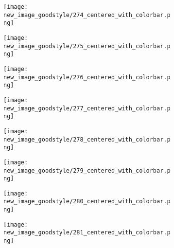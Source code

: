 \documentclass[a4paper,12pt]{article}
\begin{document}
\begin{figure}[H]
  \begin{subfigure}{0.11\textwidth}
    \texttt{[image: new\_image\_goodstyle/274\_centered\_with\_colorbar.png]}
  \end{subfigure}
  \hfill
  \begin{subfigure}{0.11\textwidth}
    \texttt{[image: new\_image\_goodstyle/275\_centered\_with\_colorbar.png]}
  \end{subfigure}
  \hfill
  \begin{subfigure}{0.11\textwidth}
    \texttt{[image: new\_image\_goodstyle/276\_centered\_with\_colorbar.png]}
  \end{subfigure}
  \hfill
  \begin{subfigure}{0.11\textwidth}
    \texttt{[image: new\_image\_goodstyle/277\_centered\_with\_colorbar.png]}
  \end{subfigure}
  \hfill
  \begin{subfigure}{0.11\textwidth}
    \texttt{[image: new\_image\_goodstyle/278\_centered\_with\_colorbar.png]}
  \end{subfigure}
  \hfill
  \begin{subfigure}{0.11\textwidth}
    \texttt{[image: new\_image\_goodstyle/279\_centered\_with\_colorbar.png]}
  \end{subfigure}
  \hfill
  \begin{subfigure}{0.11\textwidth}
    \texttt{[image: new\_image\_goodstyle/280\_centered\_with\_colorbar.png]}
  \end{subfigure}
  \hfill
  \begin{subfigure}{0.11\textwidth}
    \texttt{[image: new\_image\_goodstyle/281\_centered\_with\_colorbar.png]}
  \end{subfigure}
  \hfill
\end{figure}
\end{document}
